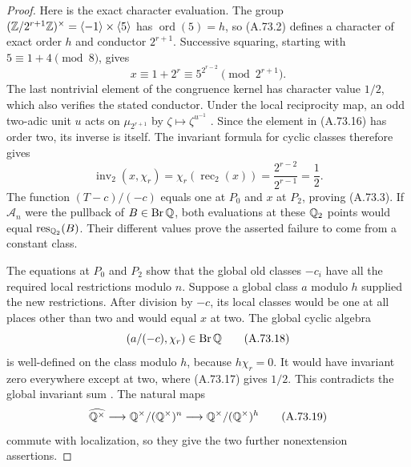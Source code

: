 \begin{proof}
Here is the exact character evaluation.  The group
$(\mathbb Z/2^{r+1}\mathbb Z)^\times=\langle-1\rangle\times\langle5\rangle$
has $\operatorname{ord}(5)=h$, so (A.73.2) defines a character
of exact order $h$ and conductor $2^{r+1}$.
Successive squaring, starting with $5\equiv1+4\pmod8$, gives
\[
        x\equiv1+2^r
           \equiv5^{2^{r-2}}\pmod{2^{r+1}}.
       \tag{A.73.16}
\]
The last nontrivial element of the congruence kernel has
character value $1/2$, which also verifies the stated conductor.
Under the local reciprocity map, an odd two-adic unit $u$
acts on $\mu_{2^{r+1}}$ by $\zeta\mapsto\zeta^{u^{-1}}$
\cite[I, Example 3.13]{MilneCFT}.  Since the element in
(A.73.16) has order two, its inverse is itself.  The invariant
formula for cyclic classes
\cite[III, Proposition 3.6]{MilneCFT} therefore gives
\[
       \operatorname{inv}_2(x,\chi_r)
           =\chi_r(\operatorname{rec}_2(x))
           =\frac{2^{r-2}}{2^{r-1}}=\frac12.
       \tag{A.73.17}
\]
The function $(T-c)/(-c)$ equals one at $P_0$ and $x$ at
$P_2$, proving (A.73.3).  If $\mathcal A_n$ were the pullback
of $B\in\operatorname{Br}\mathbb Q$, both evaluations at these
$\mathbb Q_2$ points would equal $\operatorname{res}_{\mathbb Q_2}(B)$.
Their different values prove the asserted failure to come
from a constant class.

The equations at $P_0$ and $P_2$ show that the global old
classes $-c_i$ have all the required local restrictions
modulo $n$.  Suppose a global class $a$ modulo $h$ supplied
the new restrictions.  After division by $-c$, its local
classes would be one at all places other than two and would
equal $x$ at two.  The global cyclic algebra
\[
                            (a/(-c),\chi_r)
                                   \in\operatorname{Br}\mathbb Q
       \tag{A.73.18}
\]
is well-defined on the class modulo $h$, because $h\chi_r=0$.
It would have invariant zero everywhere except at two, where
(A.73.17) gives $1/2$.  This contradicts the global invariant
sum \cite[Theorem 12.1.8]{AgentCTSkoro2019}.
The natural maps
\[
 \widehat{\mathbb Q^\times}\longrightarrow
       \mathbb Q^\times/(\mathbb Q^\times)^n\longrightarrow
       \mathbb Q^\times/(\mathbb Q^\times)^h
       \tag{A.73.19}
\]
commute with localization, so they give the two further
nonextension assertions.
\end{proof}

